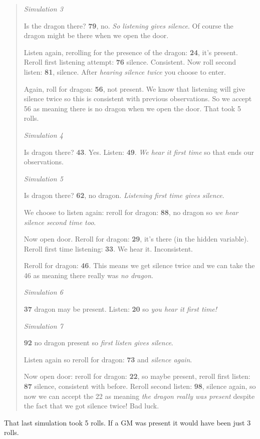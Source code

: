 \documentclass[12pt]{article}
\begin{document}
\begin{quote}
\emph{Simulation 3}

Is the dragon there? \textbf{79}, no. \emph{So listening gives silence}.
Of course the dragon might be there when we open the door.

Listen again, rerolling for the presence of the dragon: \textbf{24},
it's present. Reroll first listening attempt: \textbf{76} silence.
Consistent. Now roll second listen: \textbf{81}, silence. After
\emph{hearing silence twice} you choose to enter.

Again, roll for dragon: \textbf{56}, not present. We know that listening
will give silence twice so this is consistent with previous
observations. So we accept 56 as meaning there is no dragon when we open
the door. That took 5 rolls.

\hrulefill

\emph{Simulation 4}

Is dragon there? \textbf{43}. Yes. Listen: \textbf{49}. \emph{We hear it
first time} so that ends our observations.

\hrulefill

\emph{Simulation 5}

Is dragon there? \textbf{62}, no dragon. \emph{Listening first time
gives silence}.

We choose to listen again: reroll for dragon: \textbf{88}, no dragon so
\emph{we hear silence second time too}.

Now open door. Reroll for dragon: \textbf{29}, it's there (in the hidden
variable). Reroll first time listening: \textbf{33}. We hear it.
Inconsistent.

Reroll for dragon: \textbf{46}. This means we get silence twice and we
can take the 46 as meaning there really was \emph{no dragon}.

\hrulefill

\emph{Simulation 6}

\textbf{37} dragon may be present. Listen: \textbf{20} so \emph{you hear
it first time!}

\hrulefill

\emph{Simulation 7}

\textbf{92} no dragon present so \emph{first listen gives silence}.

Listen again so reroll for dragon: \textbf{73} and \emph{silence again}.

Now open door: reroll for dragon: \textbf{22}, so maybe present, reroll
first listen: \textbf{87} silence, consistent with before. Reroll second
listen: \textbf{98}, silence again, so now we can accept the 22 as
meaning \emph{the dragon really was present} despite the fact that we
got silence twice! Bad luck.
\end{quote}
That last simulation took 5 rolls. If a GM was present it would have
been just 3 rolls.
\end{document}

